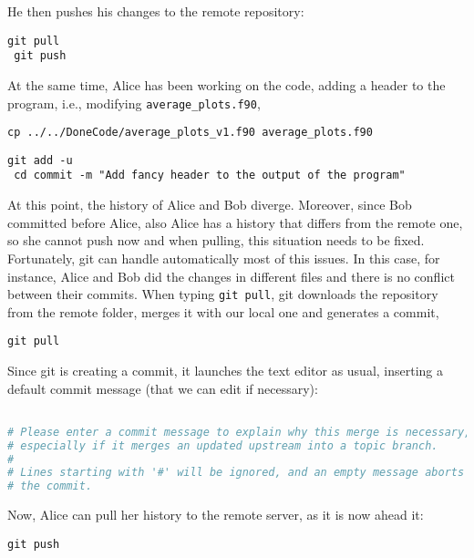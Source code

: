\documentclass[a4paper,10pt]{article}
\begin{document}
He then pushes his changes to the remote repository:

\begin{lstlisting}[style=Bob]
 git pull 
 git push  
\end{lstlisting}

At the same time, Alice has been working on the code, adding a header to the program, i.e., modifying \texttt{average\_plots.f90},

\begin{lstlisting}[style=AliceFake]
 cp ../../DoneCode/average_plots_v1.f90 average_plots.f90
\end{lstlisting}

\begin{lstlisting}[style=Alice]
 git add -u
 cd commit -m "Add fancy header to the output of the program"
\end{lstlisting}

At this point, the history of Alice and Bob diverge. Moreover, since Bob committed before Alice, also Alice has a history that differs from the remote one, so she cannot push now and when pulling, this situation needs to be fixed. Fortunately, git can handle automatically most of this issues. In this case, for instance, Alice and Bob did the changes in different files and there is no conflict between their commits. When typing \texttt{git pull}, git downloads the repository from the remote folder, merges it with our local one and generates a commit,

\begin{lstlisting}[style=Alice]
 git pull
\end{lstlisting}
Since git is creating a commit, it launches the text editor as usual, inserting a default commit message (that we can edit if necessary):

\begin{lstlisting}[style=Text,language=bash,commentstyle=\color{blue},linewidth=1.06\linewidth,xleftmargin=0.05\linewidth]
%{\color{red!50!yellow!90!}Merge branch 'master' of cluster.unial.it:/home/git/AveragePlots}%

# Please enter a commit message to explain why this merge is necessary,
# especially if it merges an updated upstream into a topic branch.
#
# Lines starting with '#' will be ignored, and an empty message aborts
# the commit.
\end{lstlisting}

Now, Alice can pull her history to the remote server, as it is now ahead it:

\begin{lstlisting}[style=Alice]
 git push
\end{lstlisting}
\end{document}
